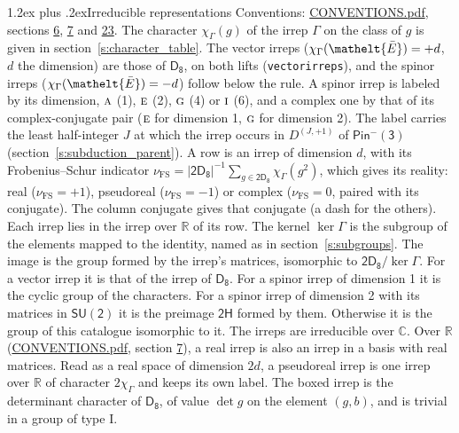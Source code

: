 \documentclass[10pt,a4paper]{article}
\makeatletter
\renewcommand\section{\@startsection{section}{1}{\z@}{-3ex plus -1ex minus -.2ex}%
  {1.2ex plus .2ex}{\normalfont\large\sffamily\bfseries\color{parttitle}}}
\numberwithin{equation}{section}
\newcommand{\eltfont}[1]{{\let\sigma\eltsigma\mathelt{#1}}}
\newcommand{\grp}[1]{\mathsf{#1}}
\newcommand{\irr}[1]{\text{\normalfont\scshape #1}}
\newcommand{\elt}[1]{\eltfont{#1}}
\newcommand{\irrJp}[2]{D^{(#1,#2)}}
\newcommand{\irchar}[1]{\chi_{#1}}
\newcommand{\fsind}{\nu_{\mathrm{FS}}}
\newcommand{\barred}[1]{\bar{#1}}
\makeatother
\begin{document}
\section{Irreducible representations}\label{s:irreps}
Conventions: \href{../../CONVENTIONS.pdf}{CONVENTIONS.pdf}, sections \href{../../../rotation/CONVENTIONS.pdf\#conv.6}{6}, \href{../../../rotation/CONVENTIONS.pdf\#conv.7}{7} and \href{../../CONVENTIONS.pdf\#conv.23}{23}.
\leavevmode\label{n:function.character}\label{n:irrep.Gamma}The character $\irchar{\Gamma}(g)$ of the irrep $\Gamma$ on the class of $g$ is given in section~\ref{s:character_table}. \label{n:index.dimension}The vector irreps ($\irchar{\Gamma}(\elt{\barred{E}}) = +d$, $d$ the dimension) are those of \href{../../../rotation/data/pdf/D8.pdf}{$\grp{D_{8}}$}, on both lifts (\texttt{vectorirreps}), and the spinor irreps ($\irchar{\Gamma}(\elt{\barred{E}}) = -d$) follow below the rule. A spinor irrep is labeled by its dimension, $\irr{a}$ (1), $\irr{e}$ (2), $\irr{g}$ (4) or $\irr{i}$ (6), and a complex one by that of its complex-conjugate pair ($\irr{e}$ for dimension 1, $\irr{g}$ for dimension 2). The label carries the least half-integer $J$ at which the irrep occurs in $\irrJp{J}{+1}$ of $\grp{Pin^{-}(3)}$ (section~\ref{s:subduction_parent}).
\leavevmode\label{n:index.frobenius}\label{n:head.irrep}\label{n:head.reality}A row is an irrep of dimension $d$, with its Frobenius--Schur indicator $\fsind = |\grp{2D_{8}}|^{-1}\allowbreak\sum_{g\in\grp{2D_{8}}}\irchar{\Gamma}(g^2)$, which gives its reality: real ($\fsind = +1$), pseudoreal ($\fsind = -1$) or complex ($\fsind = 0$, paired with its conjugate). \label{n:head.conjugate}The column conjugate gives that conjugate (a dash for the others). \label{n:head.over.real}Each irrep lies in the irrep over $\mathbb{R}$ of its row. \label{n:head.kernel}The kernel $\ker\Gamma$ is the subgroup of the elements mapped to the identity, named as in section~\ref{s:subgroups}. \label{n:head.image}The image is the group formed by the irrep's matrices, isomorphic to $\grp{2D_{8}}/\ker\Gamma$. For a vector irrep it is that of the irrep of \href{../../../rotation/data/pdf/D8.pdf}{$\grp{D_{8}}$}. For a spinor irrep of dimension 1 it is the cyclic group of the characters. For a spinor irrep of dimension 2 with its matrices in $\grp{SU(2)}$ it is the preimage $\grp{2H}$ formed by them. Otherwise it is the group of this catalogue isomorphic to it. The irreps are irreducible over $\mathbb{C}$. Over $\mathbb{R}$ (\href{../../CONVENTIONS.pdf}{CONVENTIONS.pdf}, section \href{../../../rotation/CONVENTIONS.pdf\#conv.7}{7}), a real irrep is also an irrep in a basis with real matrices. Read as a real space of dimension $2d$, a pseudoreal irrep is one irrep over $\mathbb{R}$ of character $2\irchar{\Gamma}$ and keeps its own label. \label{n:mark.determinant}The boxed irrep is the determinant character of \href{../../../rotation/data/pdf/D8.pdf}{$\grp{D_{8}}$}, of value $\det g$ on the element $(g, b)$, and is trivial in a group of type I.
\end{document}

